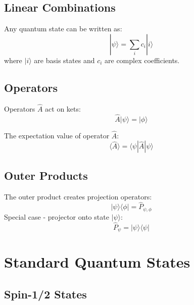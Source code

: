 \documentclass{a3cheatsheet}
\begin{document}
\begin{multicols}{3}
\subsection{Linear Combinations}

\begin{formulabox}
Any quantum state can be written as:
$$|\psi\rangle = \sum_i c_i |i\rangle$$
where $|i\rangle$ are basis states and $c_i$ are complex coefficients.
\end{formulabox}

\subsection{Operators}

\begin{infobox}
Operators $\hat{A}$ act on kets:
$$\hat{A}|\psi\rangle = |\phi\rangle$$
\end{infobox}

\begin{formulabox}
The expectation value of operator $\hat{A}$:
$$\langle\hat{A}\rangle = \langle\psi|\hat{A}|\psi\rangle$$
\end{formulabox}


\subsection{Outer Products}

\begin{formulabox}
The outer product creates projection operators:
$$|\psi\rangle\langle\phi| = \hat{P}_{\psi,\phi}$$
Special case - projector onto state $|\psi\rangle$:
$$\hat{P}_\psi = |\psi\rangle\langle\psi|$$
\end{formulabox}

\section{Standard Quantum States}

\subsection{Spin-1/2 States}


\end{multicols}
\end{document}
